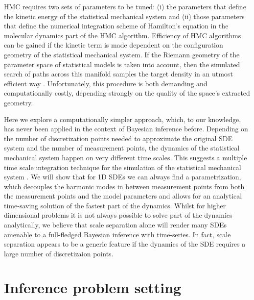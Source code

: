 \documentclass[11pt]{article}
\theoremstyle{definition}
\begin{document}
HMC requires two sets of parameters to be tuned: (i) the parameters that define the kinetic energy of the statistical mechanical system and (ii) those parameters that define the numerical integration scheme of Hamilton's equation in the molecular dynamics part of the HMC algorithm. Efficiency of HMC algorithms can be gained if the kinetic term is made dependent on the configuration geometry of the statistical mechanical system. If the Riemann geometry of the parameter space of statistical models is taken into account, then the simulated search of paths across this manifold samples the target density in an utmost efficient way
    \cite{girolami_2011_HMC}. Unfortunately, this procedure is both demanding and computationally costly,  depending strongly on the quality of the space's extracted geometry.



Here we 
explore a computationally simpler approach, which, to our knowledge, has never been applied in the context of Bayesian inference before. 
Depending on the number of discretization points needed to approximate the original SDE system and the number of measurement points, the dynamics of the statistical mechanical system happen on very different time scales. This suggests a multiple time scale integration technique for the simulation of the statistical mechanical system \cite{tuckerman_1993}. 
We will show that for 1D SDEs we can always find a parametrization, which decouples the harmonic modes in between measurement points from both the measurement points and the model parameters and allows for an analytical time-saving solution of the fastest part of the dynamics. 
Whilst for higher dimensional problems it is not always possible to solve part of the dynamics analytically, we believe that scale separation alone will render many SDEs amenable to a full-fledged Bayesian inference with time-series. 
In fact, scale separation appears to be a generic feature if the dynamics of the SDE requires a large number of discretizaion points. 

\section{Inference problem setting}
\end{document}
